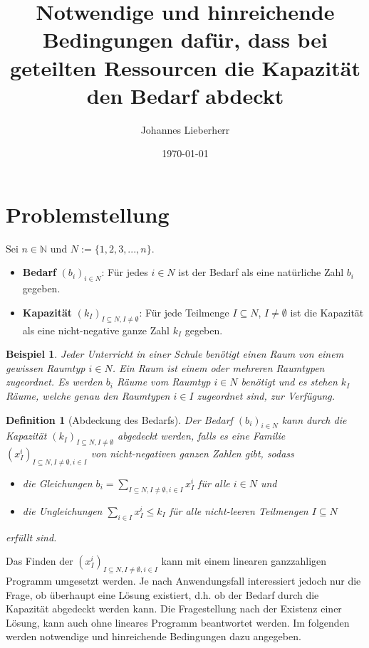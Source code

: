 \documentclass{article}
\title{Notwendige und hinreichende Bedingungen dafür, dass bei geteilten Ressourcen die Kapazität den Bedarf  abdeckt}
\author{Johannes Lieberherr}
\date{\today}
\newtheorem{definition}{Definition}
\newtheorem{example}{Beispiel}
\begin{document}
	\maketitle
	\section{Problemstellung}
	Sei $n\in \mathbb{N}$ und $N := \{1, 2, 3, ..., n\}$.
	\begin{itemize}
		\item \textbf{Bedarf} $(b_i)_{i\in N}$: Für jedes $i \in N$ ist der Bedarf als eine natürliche Zahl $b_i$ gegeben.
		\item \textbf{Kapazität} $(k_I)_{I\subseteq N, I\neq \emptyset}$: Für jede Teilmenge $I\subseteq N$, $I\neq \emptyset$ ist die Kapazität als eine nicht-negative ganze Zahl $k_I$ gegeben.
	\end{itemize}
	
	\begin{example}
		Jeder Unterricht in einer Schule benötigt einen Raum von einem gewissen Raumtyp $i\in N$. Ein Raum ist einem oder mehreren Raumtypen zugeordnet. Es werden $b_i$ Räume vom Raumtyp $i\in N$ benötigt und es stehen $k_I$ Räume, welche genau den Raumtypen $i\in I$ zugeordnet sind, zur Verfügung.
	\end{example}
	 
	
	\begin{definition}[Abdeckung des Bedarfs]
		\label{def:abdeckung_bedarf}
		Der Bedarf $(b_i)_{i\in N}$ kann durch die Kapazität $(k_I)_{I\subseteq N, I\neq \emptyset}$ abgedeckt werden, falls es eine Familie $(x_I^i)_{I\subseteq  N, I\neq \emptyset, i\in I}$ von nicht-negativen ganzen Zahlen  gibt, sodass
		\begin{itemize}
			\item die Gleichungen $b_i = \sum_{I\subseteq N, I\neq \emptyset, i\in I}x_I^i$ für alle $i\in N$ und
			\item die Ungleichungen $\sum_{i\in I} x_I^i \leq k_I$ für alle nicht-leeren Teilmengen $I\subseteq N$
		\end{itemize}
		erfüllt sind.
	\end{definition}

	Das Finden der $(x_I^i)_{I\subseteq  N, I\neq \emptyset, i\in I}$ kann mit einem linearen ganzzahligen Programm umgesetzt werden. Je nach Anwendungsfall interessiert jedoch nur die Frage, ob überhaupt eine Lösung existiert, d.h. ob der Bedarf durch die Kapazität abgedeckt werden kann. Die Fragestellung nach der Existenz einer Lösung, kann auch ohne lineares Programm beantwortet werden. Im folgenden werden notwendige und hinreichende Bedingungen dazu angegeben.
	
\end{document}
